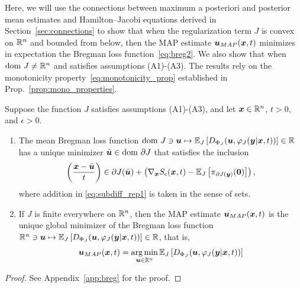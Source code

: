 Here, we will use the connections between maximum a posteriori and posterior mean estimates and Hamilton--Jacobi equations derived in Section~\ref{sec:connections} to show that when the regularization term $J$ is convex on $\mathbb{R}^n$ and bounded from below, then the MAP estimate $\boldsymbol{u}_{MAP}(\boldsymbol{x},t)$ minimizes in expectation the Bregman loss function~\eqref{eq:breg2}. We also show that when $\mathrm{dom~} J \neq \mathbb{R}^n$ and satisfies assumptions (A1)-(A3). The results rely on the monotonicity property~\eqref{eq:monotonicity_prop} established in Prop.~\eqref{prop:mono_properties}.

\begin{prop} \label{thm:bregman_div}
Suppose the function $J$ satisfies assumptions (A1)-(A3), and let $\boldsymbol{x}\in\mathbb{R}^n$, $t>0,$ and $\epsilon>0$.
\begin{enumerate}

\item[(i)] The mean Bregman loss function  $\mathrm{dom~} J\ni\boldsymbol{u}\mapsto\mathbb{E}_{J}\left [{D_{\Phi_{J}}(\boldsymbol{u},\varphi_{J}(\boldsymbol{y}|\boldsymbol{x},t))}\right] \in \mathbb{R}$ has a unique minimizer $\bar{\boldsymbol{u}}\in\mathrm{dom~}\partial J$ that satisfies the inclusion
\begin{equation} \label{eq:subdiff_rep1}
\left(\frac{\boldsymbol{x}-\bar{\boldsymbol{u}}}{t}\right) \in \partial J(\bar{\boldsymbol{u}}) + \left( \nabla_{\boldsymbol{x}}S_\epsilon(\boldsymbol{x},t) - \mathbb{E}_{J}\left [{\pi_{\partial J(\boldsymbol{y})}(\boldsymbol{0})}\right]\right),
\end{equation}
where addition in \eqref{eq:subdiff_rep1} is taken in the sense of sets.

\item[(ii)] If $J$ is finite everywhere on $\mathbb{R}^n$, then the MAP estimate $\boldsymbol{u}_{MAP}(\boldsymbol{x},t)$ is the unique global minimizer of the Bregman loss function $\mathbb{R}^n \ni \boldsymbol{u}\mapsto\mathbb{E}_{J}\left [{D_{\Phi_{J}}(\boldsymbol{u},\varphi_{J}(\boldsymbol{y}|\boldsymbol{x},t))}\right] \in \mathbb{R}$, that is,
\begin{equation} \label{eq:map_est_bregman}
    \boldsymbol{u}_{MAP}(\boldsymbol{x},t) = \operatorname*{arg\,min}_{\boldsymbol{u} \in \mathbb{R}^n} \mathbb{E}_{J}\left [{D_{\Phi_{J}}(\boldsymbol{u},\varphi_{J}(\boldsymbol{y}|\boldsymbol{x},t))}\right]
\end{equation}
\end{enumerate}
\end{prop}

\begin{proof}
See Appendix~\ref{app:breg} for the proof.
\end{proof}